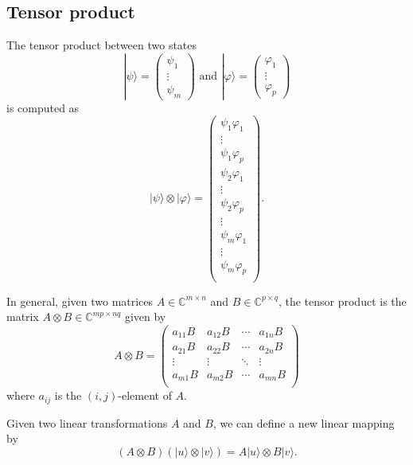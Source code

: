 \documentclass[a4paper, 10pt]{article}
\numberwithin{equation}{section}
\numberwithin{figure}{section}
\numberwithin{table}{section}
\begin{document}
\subsection{Tensor product}
The tensor product between two states
$$|\psi\rangle = \begin{pmatrix}
\psi_1\\
\vdots\\
\psi_m
\end{pmatrix}
\text{ and }
|\varphi\rangle = \begin{pmatrix}
\varphi_1\\
\vdots\\
\varphi_p
\end{pmatrix}$$
is computed as
$$
|\psi\rangle \otimes |\varphi\rangle = 
\begin{pmatrix}
\psi_1\varphi_1\\
\vdots\\
\psi_1\varphi_p\\
\psi_2\varphi_1\\
\vdots\\
\psi_2\varphi_p\\
\vdots\\
\psi_m\varphi_1\\
\vdots\\
\psi_m\varphi_p\\
\end{pmatrix}.
$$

In general, given two matrices $A\in\mathbb{C}^{m \times n}$ and $B\in\mathbb{C}^{p \times q}$, the tensor product is the matrix $A\otimes B\in\mathbb{C}^{mp \times nq}$ given by
\begin{equation}
	A\otimes B = \begin{pmatrix}
	a_{11}B & a_{12}B & \cdots & a_{1n}B\\
	a_{21}B & a_{22}B & \cdots & a_{2n}B\\
	\vdots & \vdots & \ddots & \vdots\\
	a_{m1}B & a_{m2}B & \cdots & a_{mn}B\\
	\end{pmatrix}
\end{equation}
where $a_{ij}$ is the $(i,j)$-element of $A$.

Given two linear transformations $A$ and $B$, we can define a new linear mapping by
\begin{equation}
	(A \otimes B)(|u\rangle \otimes |v\rangle) = A|u\rangle \otimes B|v\rangle. 
\end{equation}
\end{document}
